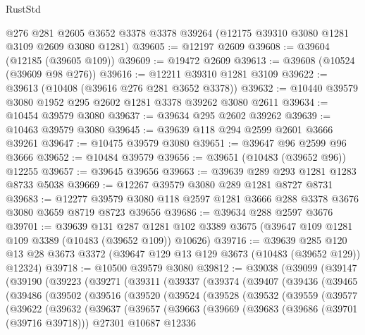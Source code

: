 \begin{lexlean}{RustStd}
\begin{coremodule}
    @276
    @281
    @2605
    @3652
    @3378
    @3378
    @39264
    (@12175 @39310 @3080 @1281 @3109 @2609 @3080 @1281)
@39605 := @12197 @2609
@39608 := @39604 (@12185 (@39605 @109))
@39609 := @19472 @2609
@39613 := @39608 (@10524 (@39609 @98 @276))
@39616 := @12211 @39310 @1281 @3109
@39622 := @39613 (@10408 (@39616 @276 @281 @3652 @3378))
@39632 := @10440 @39579 @3080 @1952 @295 @2602 @1281 @3378 @39262 @3080 @2611
@39634 := @10454 @39579 @3080
@39637 := @39634 @295 @2602 @39262
@39639 := @10463 @39579 @3080
@39645 := @39639 @118 @294 @2599 @2601 @3666 @39261
@39647 := @10475 @39579 @3080
@39651 := @39647 @96 @2599 @96 @3666
@39652 := @10484 @39579
@39656 := @39651 (@10483 (@39652 @96)) @12255
@39657 := @39645 @39656
@39663 := @39639 @289 @293 @1281 @1283 @8733 @5038
@39669 := @12267 @39579 @3080 @289 @1281 @8727 @8731
@39683 := @12277 @39579 @3080 @118 @2597 @1281 @3666 @288 @3378 @3676 @3080 @3659 @8719 @8723 @39656
@39686 := @39634 @288 @2597 @3676
@39701 := @39639
    @131
    @287
    @1281
    @102
    @3389
    @3675
    (@39647 @109 @1281 @109 @3389 (@10483 (@39652 @109)) @10626)
@39716 := @39639
    @285
    @120
    @13
    @28
    @3673
    @3372
    (@39647 @129 @13 @129 @3673 (@10483 (@39652 @129)) @12324)
@39718 := @10500 @39579 @3080
@39812 := @39038
    (@39099
      (@39147
        (@39190
          (@39223
            (@39271
              (@39311
                (@39337
                  (@39374
                    (@39407
                      (@39436
                        (@39465
                          (@39486
                            (@39502
                              (@39516
                                (@39520
                                  (@39524
                                    (@39528
                                      (@39532
                                        (@39559
                                          (@39577
                                            (@39622
                                              (@39632
                                                (@39637
                                                  (@39657
                                                    (@39663
                                                      (@39669
                                                        (@39683
                                                          (@39686 (@39701 (@39716 @39718)))
                                                          @27301
                                                          @10687
                                                          @12336

\end{coremodule}
\end{lexlean}
